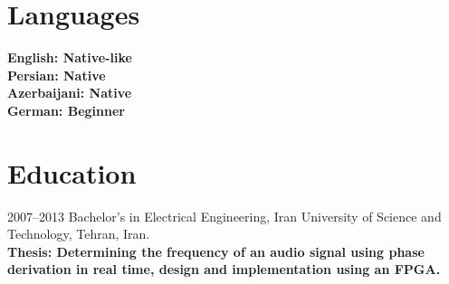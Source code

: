 \documentclass[8pt]{article}
\begin{document}
\begin{multicols}{2}
  \section*{Languages}
  \bf English: {\normalfont Native-like}\\
  \bf Persian: {\normalfont Native}\\
  \bf Azerbaijani: {\normalfont Native}\\
  \normalfont German: Beginner\\

  \section*{Education}
  2007--2013 Bachelor's in Electrical Engineering, Iran University of Science and Technology, Tehran, Iran.\\[5pt]
  \bf Thesis: \normalfont Determining the frequency of an audio signal using phase derivation in real time, design and implementation using an FPGA.


\end{multicols}
\end{document}
